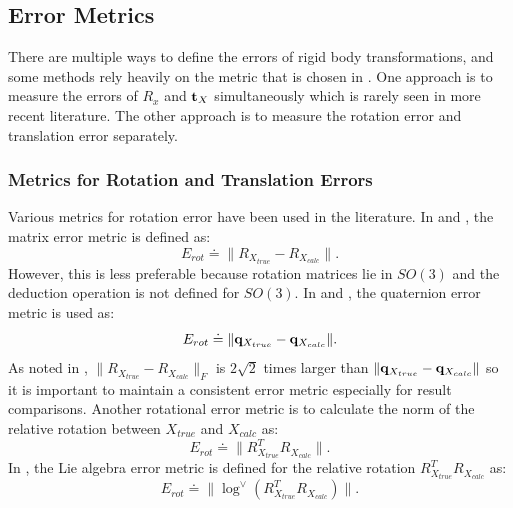 \documentclass[twocolumn,10pt]{asme2ej}
\begin{document}
\subsection{Error Metrics}
There are multiple ways to define the errors of rigid body transformations, and some methods rely heavily on the metric that is chosen in \cite{strobl2006optimal}. One approach is to measure the errors of $R_{x}$ and ${\bf t}_{X}$ simultaneously which is rarely seen in more recent literature. The other approach is to measure the rotation error and translation error separately. 
\subsubsection{ Metrics for Rotation and Translation Errors}
Various metrics for rotation error have been used in the literature. In \cite{tsai1989new} and \cite{horaud1995hand}, the matrix error metric is defined as: 
\begin{equation}
E_{rot} \doteq \| R_{X_{true}} - R_{X_{calc}} \|.
\end{equation}
However, this is less preferable because rotation matrices lie in $SO(3)  $ and the deduction operation is not defined for $SO(3)$.
In \cite{daniilidis1999hand} and \cite{andreff1999line}, the quaternion error metric is used as:
\begin{equation}
E_{rot} \doteq \|{\bf q}_{X_{true}} - {\bf q}_{X_{calc}}\|.
\end{equation}
As noted in \cite{daniilidis1996dual}, $\| R_{X_{true}} - R_{X_{calc}}\|_F$ is $2\sqrt{2}$ times larger than $\|{\bf q}_{X_{true}} - {\bf q}_{X_{calc}} \|$ so it is important to maintain a consistent error metric especially for result comparisons. 
Another rotational error metric %
 is to calculate the norm of the relative rotation between $X_{true}$ and $X_{calc}$ as:
\begin{equation}
E_{rot} \doteq \|R^{T}_{X_{true}}R_{X_{calc}}\|.
\end{equation} 
In \cite{ackermanGSI}, the Lie algebra error metric is defined for the relative rotation $R^{T}_{X_{true}}R_{X_{calc}}$ as:
\begin{equation} 
E_{rot} \doteq \|\log^{\vee}(R_{X_{true}}^TR_{X_{calc}})\|.
\label{RotError}
\end{equation}
\end{document}
